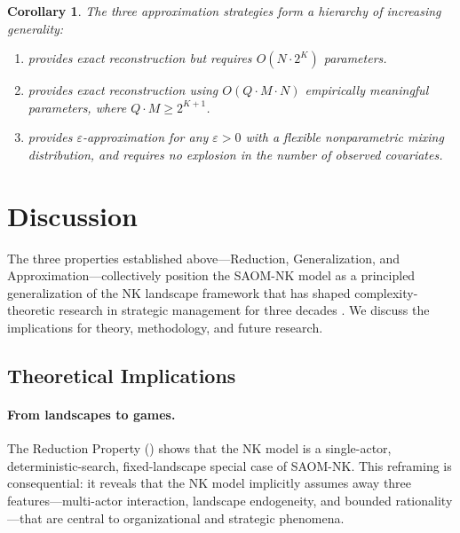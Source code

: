 \documentclass[12pt]{article}
\newtheorem{corollary}{Corollary}
\begin{document}
\begin{corollary}
\label{cor:approximation_hierarchy}
The three approximation strategies form a hierarchy of increasing
generality:
\begin{enumerate}[label=(\roman*)]
  \item {} provides exact reconstruction but
        requires $O(N \cdot 2^K)$ parameters.
  \item {} provides exact reconstruction using
        $O(Q \cdot M \cdot N)$ empirically meaningful parameters, where
        $Q \cdot M \geq 2^{K+1}$.
  \item {} provides $\varepsilon$-approximation for
        any $\varepsilon > 0$ with a flexible nonparametric mixing
        distribution, and requires no explosion in the number of observed
        covariates.
\end{enumerate}
\end{corollary}

\section{Discussion}
\label{sec:discussion}

The three properties established above---Reduction, Generalization, and
Approximation---collectively position the SAOM-NK model as a principled
generalization of the NK landscape framework that has shaped complexity-theoretic
research in strategic management for three decades
\citep{kauffman1993origins, levinthal1997adaptation, rivkin2007balancing,
siggelkow2005speed}. We discuss the implications for theory, methodology,
and future research.

\subsection{Theoretical Implications}

\paragraph{From landscapes to games.}
The Reduction Property () shows that the NK model is a
single-actor, deterministic-search, fixed-landscape special case of SAOM-NK.
This reframing is consequential: it reveals that the NK model implicitly
assumes away three features---multi-actor interaction, landscape endogeneity,
and bounded rationality---that are central to organizational and strategic
phenomena.
\end{document}
